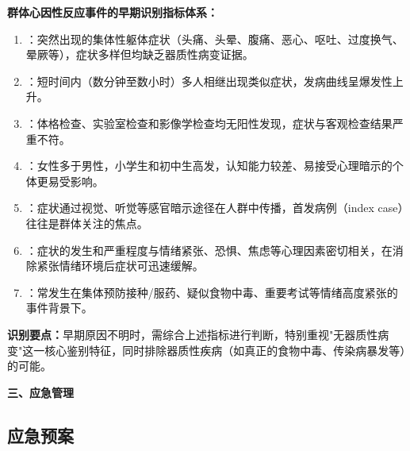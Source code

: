 \begin{keybox}
\textbf{群体心因性反应事件的早期识别指标体系：}

\begin{enumerate}[leftmargin=*]
    \item {}：突然出现的集体性躯体症状（头痛、头晕、腹痛、恶心、呕吐、过度换气、晕厥等），症状多样但均缺乏器质性病变证据。

    \item {}：短时间内（数分钟至数小时）多人相继出现类似症状，发病曲线呈爆发性上升。

    \item {}：体格检查、实验室检查和影像学检查均无阳性发现，症状与客观检查结果严重不符。

    \item {}：女性多于男性，小学生和初中生高发，认知能力较差、易接受心理暗示的个体更易受影响。

    \item {}：症状通过视觉、听觉等感官暗示途径在人群中传播，首发病例（index case）往往是群体关注的焦点。

    \item {}：症状的发生和严重程度与情绪紧张、恐惧、焦虑等心理因素密切相关，在消除紧张情绪环境后症状可迅速缓解。

    \item {}：常发生在集体预防接种/服药、疑似食物中毒、重要考试等情绪高度紧张的事件背景下。
\end{enumerate}

\textbf{识别要点：}早期原因不明时，需综合上述指标进行判断，特别重视"无器质性病变"这一核心鉴别特征，同时排除器质性疾病（如真正的食物中毒、传染病暴发等）的可能。
\end{keybox}

\textbf{三、应急管理}

\subsection{应急预案}

